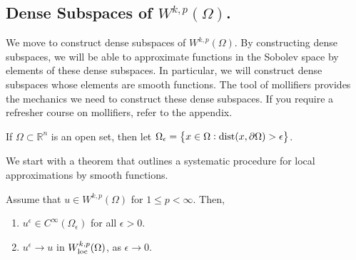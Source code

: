 \documentclass[10pt]{article}
\begin{document}
\subsection{Dense Subspaces of $W^{k,p}(\Omega)$.}
We move to construct dense subspaces of $W^{k,p}(\Omega)$. By constructing dense subspaces, we will be able to approximate functions in the Sobolev space by elements of these dense subspaces. In particular, we will construct dense subspaces whose elements are smooth functions. The tool of mollifiers provides the mechanics we need to construct these dense subspaces. If you require a refresher course on mollifiers, refer to the appendix. 
\begin{remark}
	If $\Omega \subset \mathbb{R}^n$ is an open set, then let $\Omega_\epsilon = \left\{ x \in \Omega : \operatorname{dist}(x,\partial \Omega) > \epsilon \right\}$. 
\end{remark}
We start with a theorem that outlines a systematic procedure for local approximations by smooth functions. 
\begin{theorem}
	Assume that $u \in W^{k,p}(\Omega)$ for $1 \leq p < \infty$. Then, 
	\begin{enumerate}
		\item $u^\epsilon \in C^{\infty}(\Omega_\epsilon)$ for all $\epsilon > 0$. 
		\item $u^\epsilon \to u$ in $W_{\operatorname{loc}}^{k,p}(\Omega)$, as $\epsilon \to 0$. 
	\end{enumerate}
\end{theorem}
\end{document}
